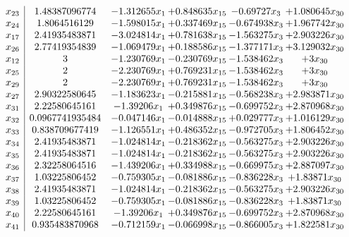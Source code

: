 \documentclass[11pt]{article}
\begin{document}
\[\begin{array}{c| c c@{\hskip 2pt} c@{\hskip 2pt} c@{\hskip 2pt} c@{\hskip 2pt} }
 x_{23}   &  1.48387096774 & -1.312655 x_{1} & + 0.848635 x_{15} & -0.69727 x_{3} & + 1.080645 x_{30}\\
 x_{24}   &  1.8064516129 & -1.598015 x_{1} & + 0.337469 x_{15} & -0.674938 x_{3} & + 1.967742 x_{30}\\
 x_{17}   &  2.41935483871 & -3.024814 x_{1} & + 0.781638 x_{15} & -1.563275 x_{3} & + 2.903226 x_{30}\\
 x_{26}   &  2.77419354839 & -1.069479 x_{1} & + 0.188586 x_{15} & -1.377171 x_{3} & + 3.129032 x_{30}\\
 x_{12}   &  3 & -1.230769 x_{1} & -0.230769 x_{15} & -1.538462 x_{3} & + 3 x_{30}\\
 x_{25}   &  2 & -2.230769 x_{1} & + 0.769231 x_{15} & -1.538462 x_{3} & + 3 x_{30}\\
 x_{29}   &  2 & -2.230769 x_{1} & + 0.769231 x_{15} & -1.538462 x_{3} & + 3 x_{30}\\
 x_{27}   &  2.90322580645 & -1.183623 x_{1} & -0.215881 x_{15} & -0.568238 x_{3} & + 2.983871 x_{30}\\
 x_{31}   &  2.22580645161 & -1.39206 x_{1} & + 0.349876 x_{15} & -0.699752 x_{3} & + 2.870968 x_{30}\\
 x_{32}   &  0.0967741935484 & -0.047146 x_{1} & -0.014888 x_{15} & + 0.029777 x_{3} & + 1.016129 x_{30}\\
 x_{33}   &  0.838709677419 & -1.126551 x_{1} & + 0.486352 x_{15} & -0.972705 x_{3} & + 1.806452 x_{30}\\
 x_{34}   &  2.41935483871 & -1.024814 x_{1} & -0.218362 x_{15} & -0.563275 x_{3} & + 2.903226 x_{30}\\
 x_{35}   &  2.41935483871 & -1.024814 x_{1} & -0.218362 x_{15} & -0.563275 x_{3} & + 2.903226 x_{30}\\
 x_{36}   &  2.32258064516 & -1.439206 x_{1} & + 0.334988 x_{15} & -0.669975 x_{3} & + 2.887097 x_{30}\\
 x_{37}   &  1.03225806452 & -0.759305 x_{1} & -0.081886 x_{15} & -0.836228 x_{3} & + 1.83871 x_{30}\\
 x_{38}   &  2.41935483871 & -1.024814 x_{1} & -0.218362 x_{15} & -0.563275 x_{3} & + 2.903226 x_{30}\\
 x_{39}   &  1.03225806452 & -0.759305 x_{1} & -0.081886 x_{15} & -0.836228 x_{3} & + 1.83871 x_{30}\\
 x_{40}   &  2.22580645161 & -1.39206 x_{1} & + 0.349876 x_{15} & -0.699752 x_{3} & + 2.870968 x_{30}\\
 x_{41}   &  0.935483870968 & -0.712159 x_{1} & -0.066998 x_{15} & -0.866005 x_{3} & + 1.822581 x_{30}\\

\end{array}\]
\end{document}
